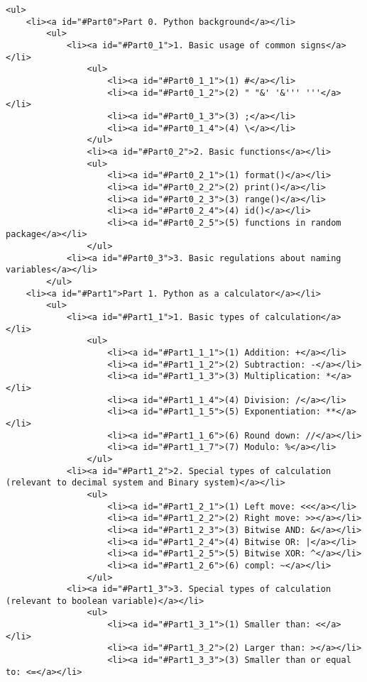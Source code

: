 \documentclass[11pt]{article}
\begin{document}
\begin{verbatim}
<ul>
    <li><a id="#Part0">Part 0. Python background</a></li>
        <ul>
            <li><a id="#Part0_1">1. Basic usage of common signs</a></li>
                <ul>
                    <li><a id="#Part0_1_1">(1) #</a></li>
                    <li><a id="#Part0_1_2">(2) " "&' '&''' '''</a></li>
                    <li><a id="#Part0_1_3">(3) ;</a></li>
                    <li><a id="#Part0_1_4">(4) \</a></li>
                </ul>
                <li><a id="#Part0_2">2. Basic functions</a></li>
                <ul>
                    <li><a id="#Part0_2_1">(1) format()</a></li>
                    <li><a id="#Part0_2_2">(2) print()</a></li>
                    <li><a id="#Part0_2_3">(3) range()</a></li>
                    <li><a id="#Part0_2_4">(4) id()</a></li>
                    <li><a id="#Part0_2_5">(5) functions in random package</a></li>
                </ul>
            <li><a id="#Part0_3">3. Basic regulations about naming variables</a></li>
        </ul>
    <li><a id="#Part1">Part 1. Python as a calculator</a></li>
        <ul>
            <li><a id="#Part1_1">1. Basic types of calculation</a></li>
                <ul>
                    <li><a id="#Part1_1_1">(1) Addition: +</a></li>
                    <li><a id="#Part1_1_2">(2) Subtraction: -</a></li>
                    <li><a id="#Part1_1_3">(3) Multiplication: *</a></li>
                    <li><a id="#Part1_1_4">(4) Division: /</a></li>
                    <li><a id="#Part1_1_5">(5) Exponentiation: **</a></li>
                    <li><a id="#Part1_1_6">(6) Round down: //</a></li>
                    <li><a id="#Part1_1_7">(7) Modulo: %</a></li>
                </ul>
            <li><a id="#Part1_2">2. Special types of calculation (relevant to decimal system and Binary system)</a></li>
                <ul>
                    <li><a id="#Part1_2_1">(1) Left move: <<</a></li>
                    <li><a id="#Part1_2_2">(2) Right move: >></a></li>
                    <li><a id="#Part1_2_3">(3) Bitwise AND: &</a></li>
                    <li><a id="#Part1_2_4">(4) Bitwise OR: |</a></li>
                    <li><a id="#Part1_2_5">(5) Bitwise XOR: ^</a></li>
                    <li><a id="#Part1_2_6">(6) compl: ~</a></li>
                </ul>
            <li><a id="#Part1_3">3. Special types of calculation (relevant to boolean variable)</a></li>
                <ul>
                    <li><a id="#Part1_3_1">(1) Smaller than: <</a></li>
                    <li><a id="#Part1_3_2">(2) Larger than: ></a></li>
                    <li><a id="#Part1_3_3">(3) Smaller than or equal to: <=</a></li>

\end{verbatim}
\end{document}
